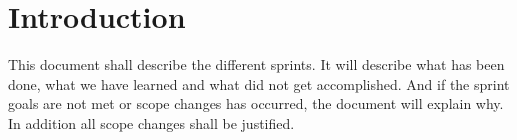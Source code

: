 \section{Introduction}

This document shall describe the different sprints. It will describe what has been done, what we have learned and what did not get accomplished. And if the sprint goals are not met or scope changes has occurred, the document will explain why. In addition all scope changes shall be justified. 



